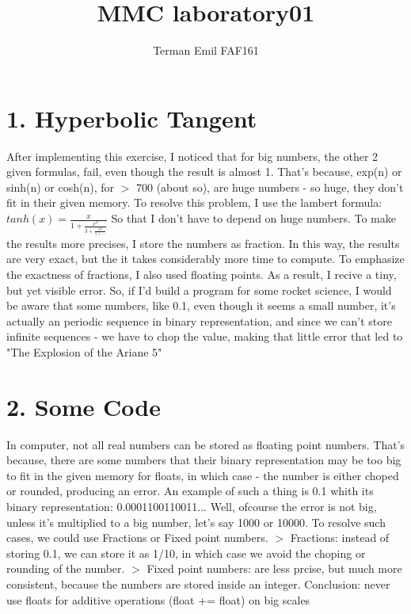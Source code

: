 \documentclass{article}
\begin{document}
	\title{MMC laboratory01}
	\author{Terman Emil FAF161}
	\maketitle

	\newpage
	\section{1. Hyperbolic Tangent}
    After implementing this exercise, I noticed that for big numbers, the other 2
given formulas, fail, even though the result is almost 1. That's because, exp(n)
or sinh(n) or cosh(n), for $>$ 700 (about so), are huge numbers - so huge, they
don't fit in their given memory.
\newline
    To resolve this problem, I use the lambert formula:
\newline    
    $tanh(x) = \frac{x}{
        1 + \frac{x ^ 2}{
            3 + \frac{x ^ 2}{
                5 + ...
            }
        }
    }$
\newline
    So that I don't have to depend on huge numbers. To make the results more
precises, I store the numbers as fraction. In this way, the results are very
exact, but the it takes considerably more time to compute.
\newline
    To emphasize the exactness of fractions, I also used floating points. As a
result, I recive a tiny, but yet visible error.
\newline
    So, if I'd build a program for some rocket science, I would be aware that
some numbers, like 0.1, even though it seems a small number, it's actually an
periodic sequence in binary representation, and since we can't store infinite
sequences - we have to chop the value, making that little error that led to "The Explosion of the Ariane 5"

    \newpage
    \section{2. Some Code}
    In computer, not all real numbers can be stored as floating point numbers.
That's because, there are some numbers that their binary representation may be
too big to fit in the given memory for floats, in which case - the number is
either choped or rounded, producing an error. An example of such a thing is
0.1 whith its binary representation: 0.0001100110011... Well, ofcourse the error
is not big, unless it's multiplied to a big number, let's say 1000 or 10000. To
resolve such cases, we could use Fractions or Fixed point numbers.
\newline
    $>$ Fractions: instead of storing 0.1, we can store it as 1/10, in which
case we avoid the choping or rounding of the number.
\newline
    $>$ Fixed point numbers: are less prcise, but much more consistent, because
the numbers are stored inside an integer.
\newline
    Conclusion: never use floats for additive operations (float += float) on
big scales
\end{document}
